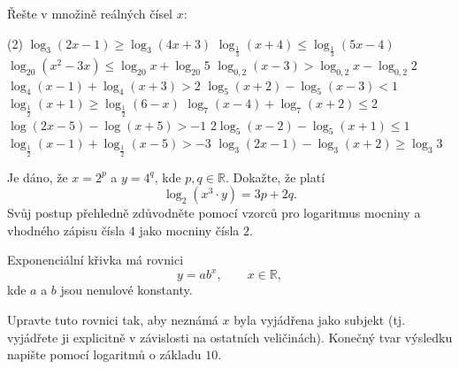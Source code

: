 \documentclass[12pt,a4paper]{article}
\begin{document}
\begin{exercise}
    Řešte v množině reálných čísel $x$:
    \begin{tasks}(2)
        \task $\log_{3}(2x - 1) \ge \log_{3}(4x + 3)$
        \task $\log_{\frac{1}{3}}(x + 4) \le \log_{\frac{1}{3}}(5x - 4)$
        \task $\log_{20}(x^{2} - 3x) \le \log_{20} x + \log_{20} 5$
        \task $\log_{0{,}2}(x - 3) > \log_{0{,}2} x - \log_{0{,}2} 2$
        \task $\log_{4}(x - 1) + \log_{4}(x + 3) > 2$
        \task $\log_{5}(x + 2) - \log_{5}(x - 3) < 1$
        \task $\log_{\frac{1}{2}}(x + 1) \ge \log_{\frac{1}{2}}(6 - x)$
        \task $\log_{7}(x - 4) + \log_{7}(x + 2) \le 2$
        \task $\log (2x - 5) - \log (x + 5) > -1$
        \task $2\log_{5}(x - 2) - \log_{5}(x + 1) \le 1$
        \task $\log_{\frac{1}{2}}(x - 1) + \log_{\frac{1}{2}}(x - 5) > -3$
        \task $\log_{3}(2x - 1) - \log_{3}(x + 2) \ge \log_{3} 3$
    \end{tasks}
\end{exercise}


\setcounter{section}{3}
\begin{exercise}
    Je dáno, že $x = 2^{p}$ a $y = 4^{q}$, kde $p, q \in \mathbb{R}$.
    Dokažte, že platí
    \[
        \log_{2}\left(x^{3} \cdot y\right) = 3p + 2q.
    \]
    Svůj postup přehledně zdůvodněte pomocí vzorců pro logaritmus mocniny
    a vhodného zápisu čísla $4$ jako mocniny čísla $2$.
\end{exercise}


\begin{exercise}
    Exponenciální křivka má rovnici
    \[
        y = a b^{x}, \qquad x \in \mathbb{R},
    \]
    kde $a$ a $b$ jsou nenulové konstanty.

    Upravte tuto rovnici tak, aby neznámá $x$ byla vyjádřena jako subjekt
    (tj. vyjádřete ji explicitně v závislosti na ostatních veličinách).
    Konečný tvar výsledku napište pomocí logaritmů o základu $10$.
\end{exercise}
\end{document}

